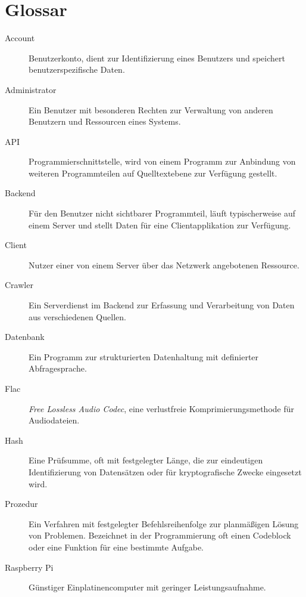 
\chapter{Glossar}

\begin{description}

\item[Account] Benutzerkonto, dient zur Identifizierung eines Benutzers und
speichert benutzerspezifische Daten.

\item[Administrator] Ein Benutzer mit besonderen Rechten zur Verwaltung von
anderen Benutzern und Ressourcen eines Systems.

\item[API] Programmierschnittstelle, wird von einem Programm zur Anbindung von
weiteren Programmteilen auf Quelltextebene zur Verfügung gestellt. 

\item[Backend] Für den Benutzer nicht sichtbarer Programmteil, läuft
typischerweise auf einem Server und stellt Daten für eine Clientapplikation zur
Verfügung.

\item[Client] Nutzer einer von einem Server über das Netzwerk angebotenen
Ressource.

\item[Crawler] Ein Serverdienst im Backend zur Erfassung und Verarbeitung von
Daten aus verschiedenen Quellen.

\item[Datenbank] Ein Programm zur strukturierten Datenhaltung mit definierter
Abfragesprache.

\item[Flac] \emph{Free Lossless Audio Codec}, eine verlustfreie Komprimierungsmethode
für Audiodateien.

\item[Hash] Eine Prüfsumme, oft mit festgelegter Länge, die zur
eindeutigen Identifizierung von Datensätzen oder für kryptografische Zwecke
eingesetzt wird.

\item[Prozedur] Ein Verfahren mit festgelegter Befehlsreihenfolge zur
planmäßigen Lösung von Problemen. Bezeichnet in der Programmierung oft einen
Codeblock oder eine Funktion für eine bestimmte Aufgabe.

\item[Raspberry Pi] Günstiger Einplatinencomputer mit geringer
Leistungsaufnahme.


\end{description}
